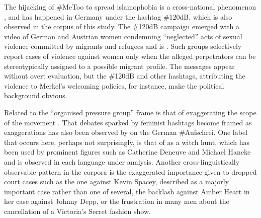 \documentclass[output=paper,english,spanish,german,english]{langsci/langscibook}
\begin{document}
\noindent The hijacking of \#MeToo to spread islamophobia is a cross-national phenomenon \parencites{farris17}{mast18}, and has happened in Germany under the hashtag \#120dB, which is also observed in the corpus of this study. The \#120dB campaign emerged with a video of German and Austrian women condemning \enquote{neglected} acts of sexual violence committed by migrants and refugees and is . Such groups selectively report cases of violence against women only when the alleged perpetrators can be stereotypically assigned to a possible migrant profile. The messages appear without overt evaluation, but the \#120dB and other hashtags, attributing the violence to Merkel's welcoming policies, for instance, make the political background obvious.


Related to the \enquote{organised pressure group} frame is that of exaggerating the scope of the movement \parencite[see][86 on the largely intangible consequences of \mt so far]{franks19}. That debates sparked by feminist hashtags become framed as exaggerations has also been observed by \textcite[382]{kornemann18} on the German \#Aufschrei. One label that occurs here, perhaps not surprisingly, is that of \mt as a witch hunt, which has been used by prominent figures such as Catherine Deneuve and Michael Haneke \parencites{mumford18}[3]{clark19} and is observed in each language under analysis. Another cross-linguistically observable pattern in the corpora is the exaggerated importance given to dropped court cases such as the one against Kevin Spacey, described as a majorly important case rather than one of several, the backlash against Amber Heart in her case against Johnny Depp, or the frustration in many men about the cancellation of a Victoria's Secret fashion show.
\end{document}
